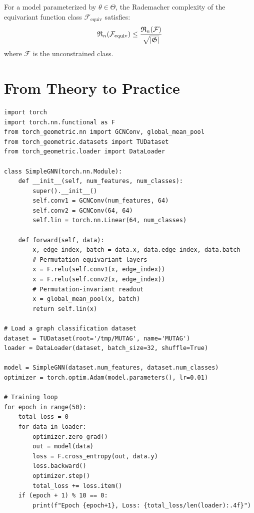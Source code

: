 \begin{proposition}
For a model parameterized by $\theta \in \Theta$, the Rademacher complexity of
the equivariant function class $\mathcal{F}_{\text{equiv}}$ satisfies:
\[
    \mathfrak{R}_n(\mathcal{F}_{\text{equiv}}) \leq
    \frac{\mathfrak{R}_n(\mathcal{F})}{\sqrt{\left| \mathfrak{G} \right|}}
\]
where $\mathcal{F}$ is the unconstrained class.
\end{proposition}

\section{From Theory to Practice}

\begin{codeblock}[title=\textbf{First GNN with PyTorch Geometric}]
\begin{verbatim}
import torch
import torch.nn.functional as F
from torch_geometric.nn import GCNConv, global_mean_pool
from torch_geometric.datasets import TUDataset
from torch_geometric.loader import DataLoader

class SimpleGNN(torch.nn.Module):
    def __init__(self, num_features, num_classes):
        super().__init__()
        self.conv1 = GCNConv(num_features, 64)
        self.conv2 = GCNConv(64, 64)
        self.lin = torch.nn.Linear(64, num_classes)

    def forward(self, data):
        x, edge_index, batch = data.x, data.edge_index, data.batch
        # Permutation-equivariant layers
        x = F.relu(self.conv1(x, edge_index))
        x = F.relu(self.conv2(x, edge_index))
        # Permutation-invariant readout
        x = global_mean_pool(x, batch)
        return self.lin(x)

# Load a graph classification dataset
dataset = TUDataset(root='/tmp/MUTAG', name='MUTAG')
loader = DataLoader(dataset, batch_size=32, shuffle=True)

model = SimpleGNN(dataset.num_features, dataset.num_classes)
optimizer = torch.optim.Adam(model.parameters(), lr=0.01)

# Training loop
for epoch in range(50):
    total_loss = 0
    for data in loader:
        optimizer.zero_grad()
        out = model(data)
        loss = F.cross_entropy(out, data.y)
        loss.backward()
        optimizer.step()
        total_loss += loss.item()
    if (epoch + 1) % 10 == 0:
        print(f"Epoch {epoch+1}, Loss: {total_loss/len(loader):.4f}")
\end{verbatim}
\end{codeblock}

